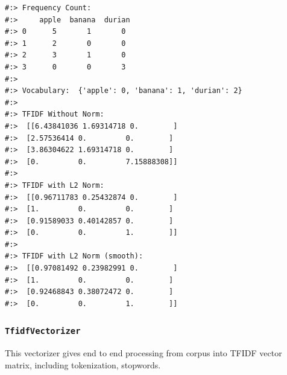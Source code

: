 \documentclass[
]{book}
\begin{document}
\begin{verbatim}
#:> Frequency Count: 
#:>     apple  banana  durian
#:> 0      5       1       0
#:> 1      2       0       0
#:> 2      3       1       0
#:> 3      0       0       3 
#:> 
#:> Vocabulary:  {'apple': 0, 'banana': 1, 'durian': 2} 
#:> 
#:> TFIDF Without Norm:
#:>  [[6.43841036 1.69314718 0.        ]
#:>  [2.57536414 0.         0.        ]
#:>  [3.86304622 1.69314718 0.        ]
#:>  [0.         0.         7.15888308]] 
#:> 
#:> TFIDF with L2 Norm:
#:>  [[0.96711783 0.25432874 0.        ]
#:>  [1.         0.         0.        ]
#:>  [0.91589033 0.40142857 0.        ]
#:>  [0.         0.         1.        ]] 
#:> 
#:> TFIDF with L2 Norm (smooth):
#:>  [[0.97081492 0.23982991 0.        ]
#:>  [1.         0.         0.        ]
#:>  [0.92468843 0.38072472 0.        ]
#:>  [0.         0.         1.        ]]
\end{verbatim}

\hypertarget{tfidfvectorizer}{%
\subsubsection{\texorpdfstring{\texttt{TfidfVectorizer}}{TfidfVectorizer}}\label{tfidfvectorizer}}

This vectorizer gives end to end processing from corpus into TFIDF vector matrix, including tokenization, stopwords.
\end{document}
